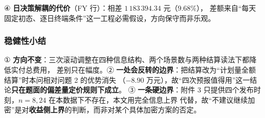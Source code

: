 ④ \textbf{日决策解耦的代价}（FY 行）：相差 \(1\,183\,394.34\) 元（\(9.68\%\)），
差额来自“每天固定初态、逐日终端条件”这一工程必需假设，方向保守而非乐观。

\subsubsection{稳健性小结}
① \textbf{方向不变}：三次滚动调整在四种信息结构、两个场景数与两种结算读法下都降低实付总费用，
差别只在幅度。② \textbf{一处会反转的边界}：把结算改为“计划量全额结算”时本问相对问题 2 的优势消失
（\(-8.90\) 万元），故“四次预报值得用”这一结论\textbf{只在题面的偏差量定价规则下成立}。
③ \textbf{一条硬边界}：附件 3 只提供四个发布时刻，\(n=8,24\) 在本数据下不存在，本文用完全信息上界
代替，故“不建议继续加密”是对\textbf{收益侧上界}的判断，而非对某个具体加密方案的否定。
